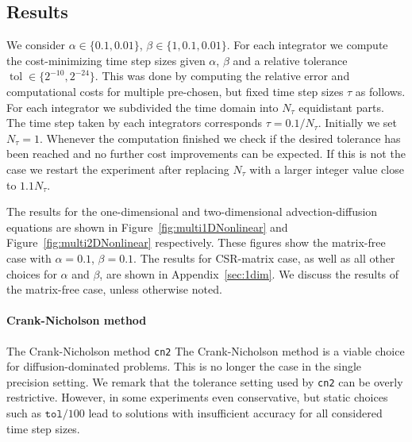 \documentclass{scrartcl}
\begin{document}
	
	
	
	\subsection{Results} \label{sec:Experiment1dim}
	We consider $\alpha\in\{0.1,0.01\}$, $\beta\in\{1, 0.1, 0.01\}$.  For each integrator we compute the cost-minimizing time step sizes given $\alpha$, $\beta$ and a relative tolerance $\operatorname{tol}\in \{2^{-10},2^{-24}\}$. This was done by computing the relative error and computational costs for multiple pre-chosen, but fixed time step sizes $\tau$ as follows. For each integrator we subdivided the time domain into $N_\tau$ equidistant parts. The time step taken by each integrators corresponds $\tau = 0.1/N_\tau$. Initially we set $N_\tau=1$. Whenever the computation finished we check if the desired tolerance has been reached and no further cost improvements can be expected. If this is not the case we restart the experiment after replacing $N_\tau$ with a larger integer value close to $1.1N_\tau$. 
	    
	The results for the one-dimensional and two-dimensional advection-diffusion equations are shown in Figure~\ref{fig:multi1DNonlinear} and Figure~\ref{fig:multi2DNonlinear} respectively. 
	These figures show the matrix-free case with $\alpha=0.1$, $\beta=0.1$. The results for CSR-matrix case, as well as all other choices for $\alpha$ and $\beta$, are shown in Appendix~\ref{sec:1dim}. We discuss the results of the matrix-free case, unless otherwise noted.
	
	\paragraph{Crank-Nicholson method}
	The Crank-Nicholson method \texttt{cn2}
	The Crank-Nicholson method is a viable choice for diffusion-dominated problems. This is no longer the case in the single precision setting.
	We remark that the tolerance setting used by \texttt{cn2} can be overly restrictive. However, in some experiments even conservative, but static choices such as $\texttt{tol}/100$ lead to solutions with insufficient accuracy for all considered time step sizes.
	
\end{document}
